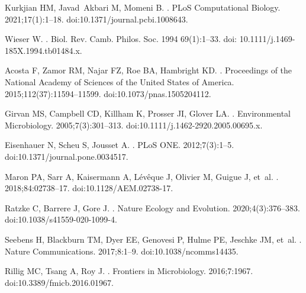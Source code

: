 \documentclass[10pt,letterpaper]{article}
\begin{document}
\begin{thebibliography}{10}
Kurkjian HM, Javad~Akbari M, Momeni B.
.
\newblock PLoS Computational Biology. 2021;17(1):1--18.
\newblock doi:{10.1371/journal.pcbi.1008643}.

Wieser W.
.
\newblock Biol. Rev. Camb. Philos. Soc. 1994 69(1):1--33.
\newblock doi: {10.1111/j.1469-185X.1994.tb01484.x}.

Acosta F, Zamor RM, Najar FZ, Roe BA, Hambright KD.
.
\newblock Proceedings of the National Academy of Sciences of the United States of America. 2015;112(37):11594--11599.
\newblock doi:{10.1073/pnas.1505204112}.

Girvan MS, Campbell CD, Killham K, Prosser JI, Glover LA.
.
\newblock Environmental Microbiology. 2005;7(3):301--313.
\newblock doi:{10.1111/j.1462-2920.2005.00695.x}.

Eisenhauer N, Scheu S, Jousset A.
.
\newblock PLoS ONE. 2012;7(3):1--5.
\newblock doi:{10.1371/journal.pone.0034517}.

Maron PA, Sarr A, Kaisermann A, Lévêque J, Olivier M, Guigue J, et~al.
. 2018;84:02738--17.
\newblock doi:{10.1128/AEM.02738-17}.

Ratzke C, Barrere J, Gore J.
.
\newblock Nature Ecology and Evolution. 2020;4(3):376--383.
\newblock doi:{10.1038/s41559-020-1099-4}.

Seebens H, Blackburn TM, Dyer EE, Genovesi P, Hulme PE, Jeschke JM, et~al.
.
\newblock Nature Communications. 2017;8:1--9.
\newblock doi:{10.1038/ncomms14435}.

Rillig MC, Tsang A, Roy J.
.
\newblock Frontiers in Microbiology. 2016;7:1967.
\newblock doi:{10.3389/fmicb.2016.01967}.


\end{thebibliography}
\end{document}
